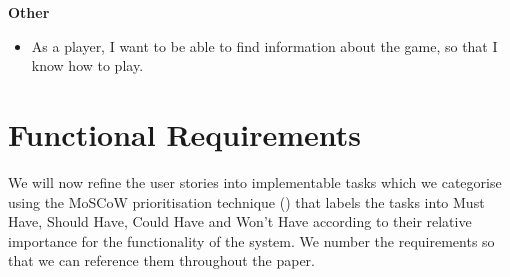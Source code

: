 \documentclass{l4proj}
\begin{document}
\textbf{Other}
\begin{itemize}
    \item As a player, I want to be able to find information about the game, so that I know how to play.
\end{itemize}

\section{Functional Requirements}
We will now refine the user stories into implementable tasks which we categorise using the MoSCoW prioritisation technique (\cite{moscow}) that labels the tasks into Must Have, Should Have, Could Have and Won't Have according to their relative importance for the functionality of the system. We number the requirements so that we can reference them throughout the paper.
\end{document}
